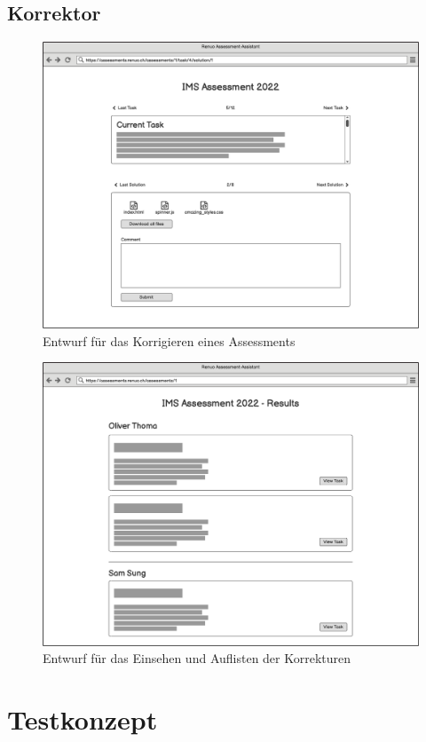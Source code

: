 \subsection{Korrektor}
\begin{figure}[H]
    \centering
    \includegraphics[width=12cm]{images/mockups/corrector-correct-assessment.png}
    \caption{\label{fig:mockup-solve-assessment}Entwurf für das Korrigieren eines Assessments}
\end{figure}
\begin{figure}[H]
    \centering
    \includegraphics[width=12cm]{images/mockups/assessment-results.png}
    \caption{\label{fig:mockup-assessment-results}Entwurf für das Einsehen und Auflisten der Korrekturen}
\end{figure}

\newpage

\section{Testkonzept} \label{sec:test-concept}

